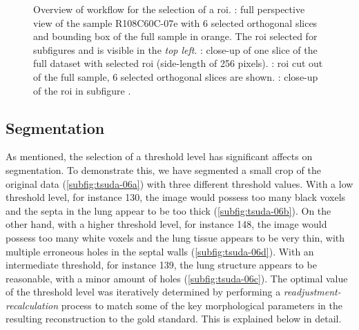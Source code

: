 \begin{figure}
{{			\label{subfig:tsuda-05d}%
		}%
	}%
	\caption[Overview of workflow for \acs{roi} selection]{Overview of workflow for the selection of a \acf{roi}. : full perspective view of the sample R108C60C-07e with 6 selected orthogonal slices and bounding box of the full sample in orange. The \ac{roi} selected for subfigures  and  is visible in the \emph{top left}. : close-up of one slice of the full dataset with selected \ac{roi} (side-length of 256 pixels). : \ac{roi} cut out of the full sample, 6 selected orthogonal slices are shown. : close-up of the \ac{roi} in subfigure .}
	\label{fig:tsuda-05}
\end{figure}

\subsection{Segmentation}
As mentioned, the selection of a threshold level has significant affects on segmentation. To demonstrate this, we have segmented a small crop of the original data (\autoref{subfig:tsuda-06a}) with three different threshold values. With a low threshold level, for instance 130, the image would possess too many black voxels and the septa in the lung appear to be too thick (\autoref{subfig:tsuda-06b}). On the other hand, with a higher threshold level, for instance 148, the image would possess too many white voxels and the lung tissue appears to be very thin, with multiple erroneous holes in the septal walls (\autoref{subfig:tsuda-06d}). With an intermediate threshold, for instance 139, the lung structure appears to be reasonable, with a minor amount of holes (\autoref{subfig:tsuda-06c}). The optimal value of the threshold level was iteratively determined by performing a \emph{readjustment-recalculation} process to match some of the key morphological parameters in the resulting \threed reconstruction to the gold standard. This is explained below in detail.

